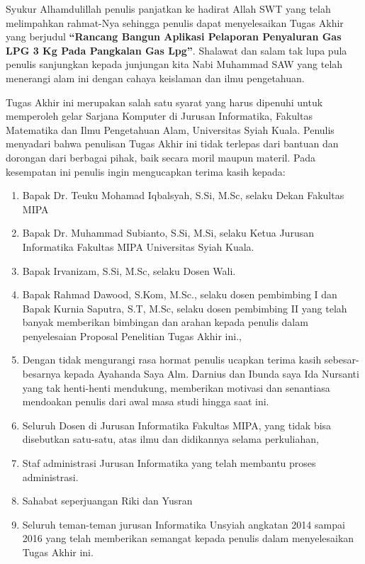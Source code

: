 \preface %


\par Syukur Alhamdulillah penulis panjatkan ke hadirat Allah SWT yang telah melimpahkan rahmat-Nya sehingga penulis dapat menyelesaikan Tugas Akhir yang berjudul \textbf{“Rancang Bangun Aplikasi Pelaporan Penyaluran Gas LPG 3 Kg Pada Pangkalan Gas Lpg”}. Shalawat dan salam tak lupa pula penulis sanjungkan kepada junjungan kita Nabi Muhammad SAW yang telah menerangi alam ini dengan cahaya keislaman dan ilmu pengetahuan.
\par Tugas Akhir ini merupakan salah satu syarat yang harus dipenuhi untuk memperoleh gelar Sarjana Komputer di Jurusan Informatika, Fakultas Matematika dan Ilmu Pengetahuan Alam, Universitas Syiah Kuala. Penulis menyadari bahwa penulisan Tugas Akhir ini tidak terlepas dari bantuan dan dorongan dari berbagai pihak, baik secara moril maupun materil. Pada kesempatan ini penulis ingin mengucapkan terima kasih kepada:

\begin{enumerate}
	\item{Bapak Dr. Teuku Mohamad Iqbalsyah, S.Si, M.Sc, selaku Dekan Fakultas MIPA}
	\item{Bapak Dr. Muhammad Subianto, S.Si, M.Si, selaku Ketua Jurusan Informatika Fakultas MIPA Universitas Syiah Kuala.}
	\item{Bapak Irvanizam, S.Si, M.Sc, selaku Dosen Wali.}
	\item{Bapak Rahmad Dawood, S.Kom, M.Sc., selaku dosen pembimbing I dan Bapak Kurnia Saputra, S.T, M.Sc, selaku dosen pembimbing II yang telah banyak memberikan bimbingan dan arahan kepada penulis dalam penyelesaian Proposal Penelitian Tugas Akhir ini.,}
	\item{Dengan tidak mengurangi rasa hormat penulis ucapkan terima kasih sebesar- besarnya kepada Ayahanda Saya Alm. Darnius dan Ibunda saya Ida Nursanti yang tak henti-henti mendukung, memberikan motivasi dan senantiasa mendoakan penulis dari awal masa studi hingga saat ini.}
	\item{Seluruh Dosen di Jurusan Informatika Fakultas MIPA, yang tidak bisa disebutkan satu-satu, atas ilmu dan didikannya selama perkuliahan,}
	\item {Staf administrasi Jurusan Informatika yang telah membantu proses administrasi.}
	\item {Sahabat seperjuangan Riki dan Yusran } 
	\item{Seluruh teman-teman jurusan Informatika Unsyiah angkatan 2014 sampai 2016 yang telah memberikan semangat kepada penulis dalam menyelesaikan Tugas Akhir ini.}
\end{enumerate}

